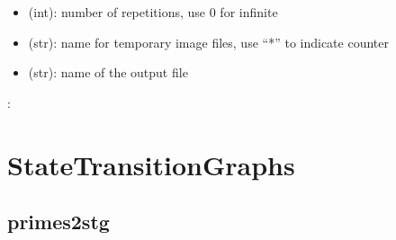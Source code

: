 \documentclass[letterpaper,10pt,english]{sphinxmanual}
\begin{document}
\begin{fulllineitems}
\begin{description}
\begin{itemize}
\item {} 
 (int): number of repetitions, use 0 for infinite

\item {} 
 (str): name for temporary image files, use “*” to indicate counter

\item {} 
 (str): name of the output  file

\end{itemize}

\end{description}

:

\begin{sphinxVerbatim}[commandchars=\\\{\}]
  \PYG{p}{[}   \PYG{p}{]}
  
\end{sphinxVerbatim}

\end{fulllineitems}



\section{StateTransitionGraphs}
\label{\detokenize{StateTransitionGraphs:statetransitiongraphs}}\label{\detokenize{StateTransitionGraphs::doc}}\label{\detokenize{StateTransitionGraphs:id1}}

\subsection{primes2stg}
\label{\detokenize{StateTransitionGraphs:primes2stg}}\label{\detokenize{StateTransitionGraphs:id2}}
\end{document}

